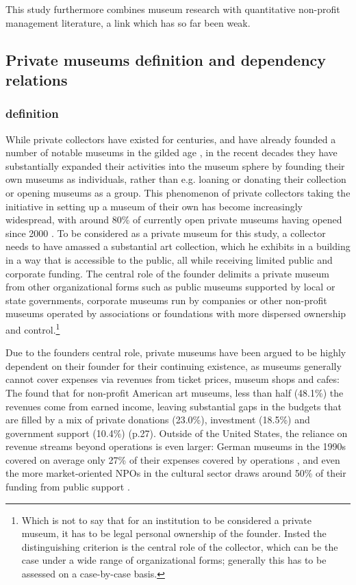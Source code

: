 \documentclass[12pt]{article}
\begin{document}
This study furthermore combines museum research with quantitative non-profit management literature, a link which has so far been weak. 
\subsection*{Private museums definition and dependency relations}



\subsubsection*{definition}

\bigbreak
\noindent
While private collectors have existed for centuries, and have already founded a number of notable museums in the gilded age \parencite{diMaggio_1982_boston,Higonnet_2003_sight,Duncan_1995_civilizing}, in the recent decades they have substantially expanded their activities into the museum sphere by founding their own museums as individuals, rather than e.g. loaning or donating their collection or opening museums as a group.
This phenomenon of private collectors taking the initiative in setting up a museum of their own has become increasingly widespread, with around 80\% of currently open private museums having opened since 2000 \parencite{Velthuis_etal_2023_boom}.
To be considered as a private museum for this study, a collector needs to have amassed a substantial art collection, which he exhibits in a building in a way that is accessible to the public, all while receiving limited public and corporate funding.
The central role of the founder delimits a private museum from other organizational forms such as public museums supported by local or state governments, corporate museums run by companies or other non-profit museums operated by associations or foundations with more dispersed ownership and control.\footnote{Which is not to say that for an institution to be considered a private museum, it has to be legal personal ownership of the founder. Insted the distinguishing criterion is the central role of the collector, which can be the case under a wide range of organizational forms; generally this has to be assessed on a case-by-case basis.}



Due to the founders central role, private museums have been argued to be highly dependent on their founder for their continuing existence, as museums generally cannot cover expenses via revenues from ticket prices, museum shops and cafes:
The \textcite{IMLS_2008_funding} found that for non-profit American art museums, less than half (48.1\%) the revenues come from earned income, leaving substantial gaps in the budgets that are filled by a mix of private donations (23.0\%), investment (18.5\%) and government support (10.4\%) (p.27).
Outside of the United States, the reliance on revenue streams beyond operations is even larger:
German museums in the 1990s covered on average only 27\% of their expenses covered by operations \parencite[p.233]{Martin_1993_museen}, and even the more market-oriented NPOs in the cultural sector draws around 50\% of their funding from public support \parencite[p.82]{Zimmer_Priller_2007_gemeinnuetzig}.
\end{document}
